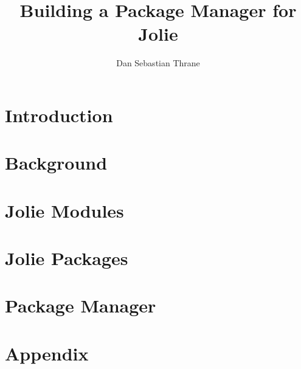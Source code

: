 \documentclass[11pt, a4paper]{report} %
\title{Building a Package Manager for Jolie}
\author{Dan Sebastian Thrane}
\theoremstyle{definition}
\newcommand{\blankpage}{
  \newpage
  \thispagestyle{empty}
  \mbox{}
  \newpage
}
\begin{document}

\tableofcontents

\blankpage

\pagestyle{MyStyle}

\chapter{Introduction}


\chapter{Background}


\chapter{Jolie Modules}


\chapter{Jolie Packages}


\chapter{Package Manager}


\appendix
\chapter{Appendix}

\end{document}
